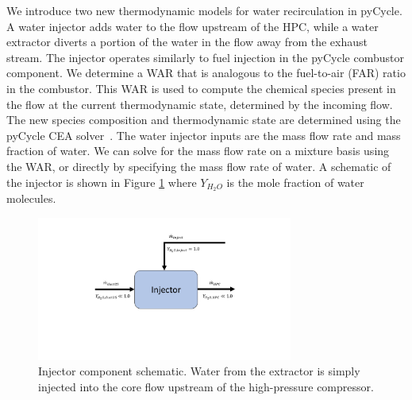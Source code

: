 \documentclass[conf]{new-aiaa}
\begin{document}
We introduce two new thermodynamic models for water recirculation in pyCycle.
A water injector adds water to the flow upstream of the HPC, while a water extractor diverts a portion of the water in the flow away from the exhaust stream.
The injector operates similarly to fuel injection in the pyCycle combustor component.
We determine a WAR that is analogous to the fuel-to-air (FAR) ratio in the combustor.
This WAR is used to compute the chemical species present in the flow at the current thermodynamic state, determined by the incoming flow.
The new species composition and thermodynamic state are determined using the pyCycle CEA solver~\cite{Gray2017b}.
The water injector inputs are the mass flow rate and mass fraction of water.
We can solve for the mass flow rate on a mixture basis using the WAR, or directly by specifying the mass flow rate of water.
A schematic of the injector is shown in Figure \ref{fig:injector} where $Y_{H_2O}$ is the mole fraction of water molecules.

\begin{figure}[hbt!]
    \centering
    \includegraphics[width=0.75\textwidth]{injector.pdf}
    \caption{
        Injector component schematic.
        Water from the extractor is simply injected into the core flow upstream of the high-pressure compressor.
    }
    \label{fig:injector}
\end{figure}
\end{document}
